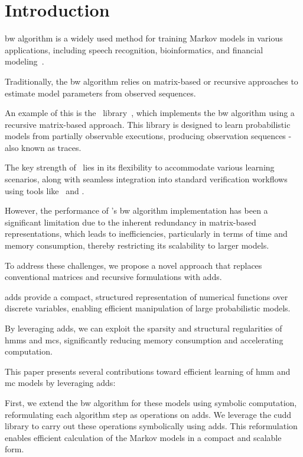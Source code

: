 
\section{Introduction}\label{sec:introduction}
 \gls{bw} algorithm is a widely used method for training Markov models in various applications, including speech recognition, bioinformatics, and financial modeling~\cite{chavan2013overview,ciocchetta2009bio,mamon2007hidden}.

Traditionally, the \gls{bw} algorithm relies on matrix-based or recursive approaches to estimate model parameters from observed sequences.

An example of this is the \Jajapy\ library~\cite{ReynouardIB23}, which implements the \gls{bw} algorithm using a recursive matrix-based approach.
This library is designed to learn probabilistic models from partially observable executions, producing observation sequences - also known as traces.

The key strength of \Jajapy\ lies in its flexibility to accommodate various learning scenarios, along with seamless integration into standard verification workflows using tools like \Storm\ and \Prism.

However, the performance of \Jajapy's \gls{bw} algorithm implementation has been a significant limitation due to the inherent redundancy in matrix-based representations, which leads to inefficiencies, particularly in terms of time and memory consumption, thereby restricting its scalability to larger models.

To address these challenges, we propose a novel approach that replaces conventional matrices and recursive formulations with \glspl{add}.

\glspl{add} provide a compact, structured representation of numerical functions over discrete variables, enabling efficient manipulation of large probabilistic models.

By leveraging \glspl{add}, we can exploit the sparsity and structural regularities of \glspl{hmm} and \glspl{mc}, significantly reducing memory consumption and accelerating computation.

This paper presents several contributions toward efficient learning of \gls{hmm} and \gls{mc} models by leveraging \glspl{add}:

First, we extend the \gls{bw} algorithm for these models using symbolic computation, reformulating each algorithm step as operations on \glspl{add}.
We leverage the \gls{cudd} library to carry out these operations symbolically using \glspl{add}.
This reformulation enables efficient calculation of the Markov models in a compact and scalable form.

